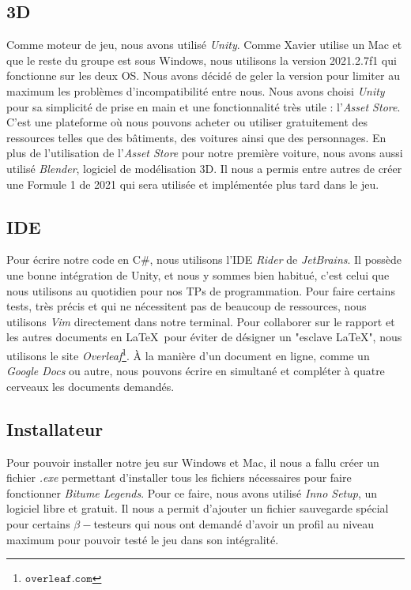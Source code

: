 \documentclass[a4paper,12pt]{article}
\newcommand{\btmlgs}{\textsl{Bitume Legends}}
\begin{document}
        \subsection{3D}
            Comme moteur de jeu, nous avons utilisé \textsl{Unity}. Comme Xavier utilise un Mac 
            et que le reste du groupe est sous Windows, nous utilisons la version 2021.2.7f1 qui
            fonctionne sur les deux OS. Nous avons décidé de geler la version pour limiter au
            maximum les problèmes d'incompatibilité entre nous. Nous avons choisi \textsl{Unity}
            pour sa simplicité de prise en main et une fonctionnalité très utile :
            l'\textsl{Asset Store}. C'est une plateforme où nous pouvons acheter ou
            utiliser gratuitement des ressources telles que des bâtiments, des voitures ainsi que
            des personnages. En plus de l'utilisation de l'\textsl{Asset Store} pour notre première
            voiture, nous avons aussi utilisé \textsl{Blender}, logiciel de modélisation 3D. Il
            nous a permis entre autres de créer une Formule 1 de 2021 qui sera utilisée et
            implémentée plus tard dans le jeu.

        \subsection{IDE}
            Pour écrire notre code en C\#, nous utilisons l'IDE \textsl{Rider} de 
            \textsl{JetBrains}. Il possède une bonne intégration de Unity, et nous
            y sommes bien habitué, c'est celui que nous utilisons au quotidien pour
            nos TPs de programmation. Pour faire certains tests, très précis et qui
            ne nécessitent pas de beaucoup de ressources, nous utilisons \textsl{Vim}
            directement dans notre terminal.
            Pour collaborer sur le rapport et les autres documents en \LaTeX\, 
            pour éviter de désigner un "esclave \LaTeX", nous utilisons le site 
            \textsl{Overleaf}\footnote{\(\mathtt{overleaf.com}\)}. 
            À la manière d'un document en ligne, comme 
            un \textsl{Google Docs} ou autre, nous pouvons écrire en
            simultané et compléter à quatre cerveaux les documents demandés.
            
        \subsection{Installateur} 
         
        Pour pouvoir installer notre jeu sur Windows et Mac, il nous a fallu créer un fichier \textsl{.exe} permettant d'installer tous les fichiers nécessaires pour faire fonctionner \btmlgs.
        Pour ce faire, nous avons utilisé \textsl{Inno Setup}, un logiciel libre et gratuit. Il nous a permit d'ajouter un fichier sauvegarde spécial pour certains \(\beta-\)testeurs qui nous ont demandé d'avoir un profil au niveau maximum pour pouvoir testé le jeu dans son intégralité.
\end{document}
